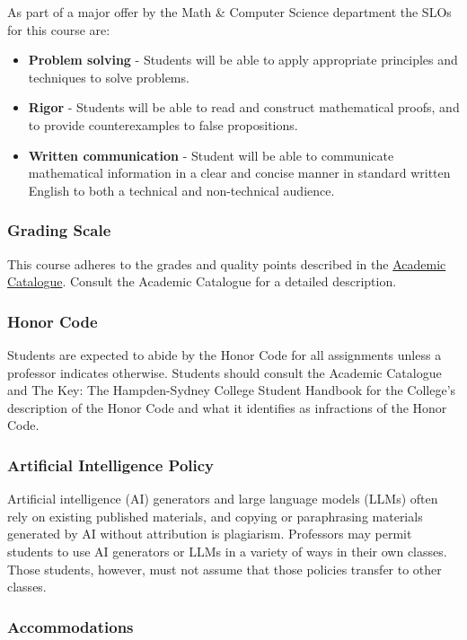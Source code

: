 \documentclass[10pt]{article}
\begin{document}
As part of a major offer by the Math \& Computer Science department the SLOs for this course are:
\begin{itemize}
\item \textbf{Problem solving} - Students will be able to apply appropriate principles and techniques to solve problems.
\item \textbf{Rigor} - Students will be able to read and construct mathematical proofs, and to provide counterexamples to false propositions.
\item \textbf{Written communication} - Student will be able to communicate mathematical information in a clear and concise manner in standard written English to both a technical and non-technical audience.
\end{itemize}

\subsubsection*{Grading Scale} 

This course adheres to the grades and quality points described in the \href{https://www.hsc.edu/academic-catalogues}{Academic Catalogue}. Consult the Academic Catalogue for a detailed description. 


\subsubsection*{Honor Code}

Students are expected to abide by the Honor Code for all assignments unless a professor indicates otherwise. Students should consult the Academic Catalogue and The Key: The Hampden-Sydney College Student Handbook for the College’s description of the Honor Code and what it identifies as infractions of the Honor Code.

\subsubsection*{Artificial Intelligence Policy}

Artificial intelligence (AI) generators and large language models (LLMs) often rely on existing published materials, and copying or paraphrasing materials generated by AI without attribution is plagiarism. Professors may permit students to use AI generators or LLMs in a variety of ways in their own classes. Those students, however, must not assume that those policies transfer to other classes.

\subsubsection*{Accommodations}
\end{document}
